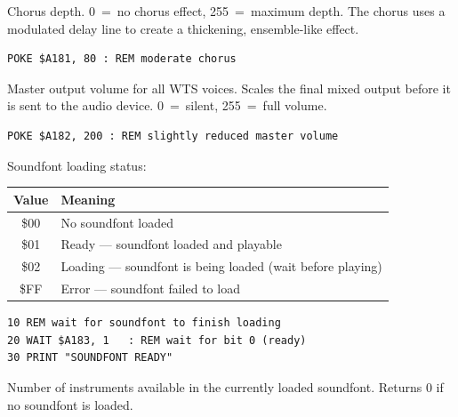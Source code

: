 
Chorus depth.  0~=~no chorus effect, 255~=~maximum depth.  The chorus uses a
modulated delay line to create a thickening, ensemble-like effect.

\begin{lstlisting}
POKE $A181, 80 : REM moderate chorus
\end{lstlisting}



Master output volume for all WTS voices.  Scales the final mixed output before
it is sent to the audio device.  0~=~silent, 255~=~full volume.

\begin{lstlisting}
POKE $A182, 200 : REM slightly reduced master volume
\end{lstlisting}



Soundfont loading status:

\begin{center}
\small
\begin{tabular}{@{}cl@{}}
\toprule
\textbf{Value} & \textbf{Meaning} \\
\midrule
\$00 & No soundfont loaded \\
\$01 & Ready --- soundfont loaded and playable \\
\$02 & Loading --- soundfont is being loaded (wait before playing) \\
\$FF & Error --- soundfont failed to load \\
\bottomrule
\end{tabular}
\end{center}

\begin{lstlisting}
10 REM wait for soundfont to finish loading
20 WAIT $A183, 1   : REM wait for bit 0 (ready)
30 PRINT "SOUNDFONT READY"
\end{lstlisting}



Number of instruments available in the currently loaded soundfont.  Returns 0
if no soundfont is loaded.

